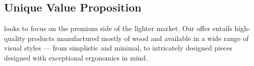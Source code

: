 \subsection{Unique Value Proposition}
{\fw} looks to focus on the premium side of the lighter market. Our offer entails high-quality products manufactured
mostly of wood and available in a wide range of visual styles --- from simplistic and minimal, to intricately designed
pieces designed with exceptional ergonomics in mind.
